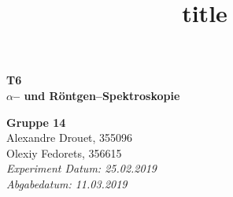 \documentclass[a4paper,14pt]{article}
\title{\LARGE title}
\date{}
\newcommand{\skippage}{\clearpage{\thispagestyle{empty}\cleardoublepage}}
\begin{document}
	
\begin{titlepage}
	\thispagestyle{empty}
	
%
%
%
	
	\vspace{5cm}
	\begin{center}
		\hdashrule{\linewidth}{1pt}{}
		\vskip -0.25cm
		\hdashrule{\linewidth}{0.5pt}{}
		
		\vspace{0.5cm}
		\Huge{ \textbf{ T6 \\}}
		\LARGE{ \textbf{$\alpha$-- und R\"ontgen--Spektroskopie } } 
		
		\hdashrule{\linewidth}{0.5pt}{}
		\vskip -0.7cm
		\hdashrule{\linewidth}{1pt}{}
		
		\vspace{3cm}
		\Large{\textbf{ Gruppe 14 \\}}
		\Large{Alexandre Drouet, 355096 \\ Olexiy Fedorets, 356615 \\}
		\vspace{1cm}
		\Large{\textsl{ Experiment Datum: 25.02.2019 \\ Abgabedatum: 11.03.2019}}

	\end{center}
	\vfill
	
\end{titlepage}
	
	
	
\skippage
{}
\thispagestyle{plain}

\tableofcontents
\listoffigures

\begingroup
\let\cleardoublepage\relax
\let\clearpage\relax
\listoftables
\endgroup

\skippage

\setcounter{page}{1}
\restoregeometry
\thispagestyle{fancy}

\skippage
	
\end{document}
